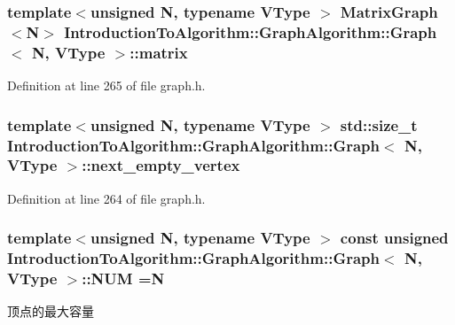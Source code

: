 \subsubsection[{matrix}]{\setlength{\rightskip}{0pt plus 5cm}template$<$unsigned N, typename V\+Type $>$ {\bf Matrix\+Graph}$<$N$>$ {\bf Introduction\+To\+Algorithm\+::\+Graph\+Algorithm\+::\+Graph}$<$ N, V\+Type $>$\+::matrix}\label{struct_introduction_to_algorithm_1_1_graph_algorithm_1_1_graph_a498323460ec613f12e1039afdca6c10a}


Definition at line 265 of file graph.\+h.

\hypertarget{struct_introduction_to_algorithm_1_1_graph_algorithm_1_1_graph_a07a8f2eafc8175787a6ce1f26f1252d0}{}
\subsubsection[{next\+\_\+empty\+\_\+vertex}]{\setlength{\rightskip}{0pt plus 5cm}template$<$unsigned N, typename V\+Type $>$ std\+::size\+\_\+t {\bf Introduction\+To\+Algorithm\+::\+Graph\+Algorithm\+::\+Graph}$<$ N, V\+Type $>$\+::next\+\_\+empty\+\_\+vertex}\label{struct_introduction_to_algorithm_1_1_graph_algorithm_1_1_graph_a07a8f2eafc8175787a6ce1f26f1252d0}


Definition at line 264 of file graph.\+h.

\hypertarget{struct_introduction_to_algorithm_1_1_graph_algorithm_1_1_graph_aba53db2c8cade306553fc1e03f138aa2}{}
\subsubsection[{N\+U\+M}]{\setlength{\rightskip}{0pt plus 5cm}template$<$unsigned N, typename V\+Type $>$ const unsigned {\bf Introduction\+To\+Algorithm\+::\+Graph\+Algorithm\+::\+Graph}$<$ N, V\+Type $>$\+::N\+U\+M =N\hspace{0.3cm}{\ttfamily [static]}}\label{struct_introduction_to_algorithm_1_1_graph_algorithm_1_1_graph_aba53db2c8cade306553fc1e03f138aa2}
顶点的最大容量 

